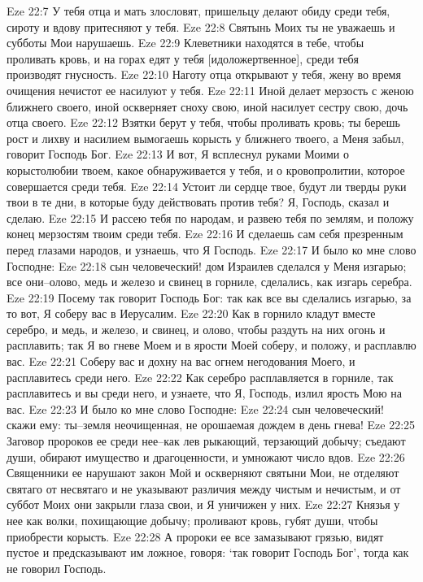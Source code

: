 Eze 22:7  У тебя отца и мать злословят, пришельцу делают обиду среди тебя, сироту и вдову притесняют у тебя.
Eze 22:8  Святынь Моих ты не уважаешь и субботы Мои нарушаешь.
Eze 22:9  Клеветники находятся в тебе, чтобы проливать кровь, и на горах едят у тебя [идоложертвенное], среди тебя производят гнусность.
Eze 22:10  Наготу отца открывают у тебя, жену во время очищения нечистот ее насилуют у тебя.
Eze 22:11  Иной делает мерзость с женою ближнего своего, иной оскверняет сноху свою, иной насилует сестру свою, дочь отца своего.
Eze 22:12  Взятки берут у тебя, чтобы проливать кровь; ты берешь рост и лихву и насилием вымогаешь корысть у ближнего твоего, а Меня забыл, говорит Господь Бог.
Eze 22:13  И вот, Я всплеснул руками Моими о корыстолюбии твоем, какое обнаруживается у тебя, и о кровопролитии, которое совершается среди тебя.
Eze 22:14  Устоит ли сердце твое, будут ли тверды руки твои в те дни, в которые буду действовать против тебя? Я, Господь, сказал и сделаю.
Eze 22:15  И рассею тебя по народам, и развею тебя по землям, и положу конец мерзостям твоим среди тебя.
Eze 22:16  И сделаешь сам себя презренным перед глазами народов, и узнаешь, что Я Господь.
Eze 22:17  И было ко мне слово Господне:
Eze 22:18  сын человеческий! дом Израилев сделался у Меня изгарью; все они--олово, медь и железо и свинец в горниле, сделались, как изгарь серебра.
Eze 22:19  Посему так говорит Господь Бог: так как все вы сделались изгарью, за то вот, Я соберу вас в Иерусалим.
Eze 22:20  Как в горнило кладут вместе серебро, и медь, и железо, и свинец, и олово, чтобы раздуть на них огонь и расплавить; так Я во гневе Моем и в ярости Моей соберу, и положу, и расплавлю вас.
Eze 22:21  Соберу вас и дохну на вас огнем негодования Моего, и расплавитесь среди него.
Eze 22:22  Как серебро расплавляется в горниле, так расплавитесь и вы среди него, и узнаете, что Я, Господь, излил ярость Мою на вас.
Eze 22:23  И было ко мне слово Господне:
Eze 22:24  сын человеческий! скажи ему: ты--земля неочищенная, не орошаемая дождем в день гнева!
Eze 22:25  Заговор пророков ее среди нее--как лев рыкающий, терзающий добычу; съедают души, обирают имущество и драгоценности, и умножают число вдов.
Eze 22:26  Священники ее нарушают закон Мой и оскверняют святыни Мои, не отделяют святаго от несвятаго и не указывают различия между чистым и нечистым, и от суббот Моих они закрыли глаза свои, и Я уничижен у них.
Eze 22:27  Князья у нее как волки, похищающие добычу; проливают кровь, губят души, чтобы приобрести корысть.
Eze 22:28  А пророки ее все замазывают грязью, видят пустое и предсказывают им ложное, говоря: `так говорит Господь Бог', тогда как не говорил Господь.
